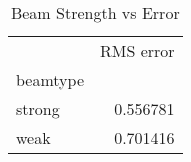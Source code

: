 \begin{table}
\caption{Beam Strength vs Error}
\begin{tabular}{lr}
 & RMS error \\
beamtype &  \\
strong & 0.556781 \\
weak & 0.701416 \\
\end{tabular}
\end{table}
